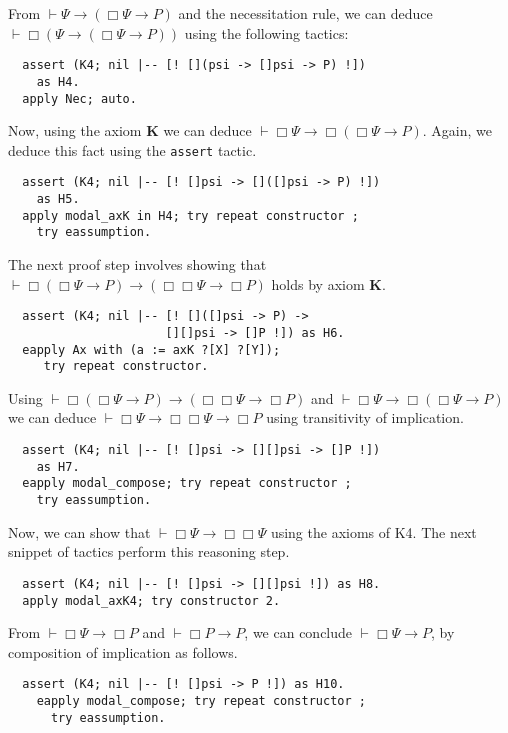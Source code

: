 \documentclass[sigconf,anonymous]{acmart}
\begin{document}
From $\vdash \Psi \to (\Box \Psi \to P)$ and the necessitation
rule, we can deduce $\vdash \Box (\Psi \to (\Box \Psi \to P))$
using the following tactics:
\begin{verbatim}
  assert (K4; nil |-- [! [](psi -> []psi -> P) !])
    as H4.
  apply Nec; auto.
\end{verbatim}

\noindent Now, using the axiom \textbf{K} we can deduce $\vdash \Box \Psi \to
\Box (\Box \Psi \to P)$. Again, we deduce this fact using the
\texttt{assert} tactic.

\begin{verbatim}
  assert (K4; nil |-- [! []psi -> []([]psi -> P) !])
    as H5.
  apply modal_axK in H4; try repeat constructor ;
    try eassumption.
\end{verbatim}

\noindent The next proof step involves showing that
$\vdash \Box (\Box \Psi \to P)\to (\Box \Box \Psi \to \Box P)$ holds
by axiom \textbf{K}.

\begin{verbatim}
  assert (K4; nil |-- [! []([]psi -> P) ->
                      [][]psi -> []P !]) as H6.
  eapply Ax with (a := axK ?[X] ?[Y]);
     try repeat constructor.
\end{verbatim}

\noindent Using $\vdash \Box (\Box \Psi \to P)\to (\Box \Box \Psi \to \Box P)$ and
$\vdash \Box \Psi \to\Box (\Box \Psi \to P)$ we can deduce
$\vdash \Box \Psi \to \Box \Box \Psi \to \Box P$ using transitivity of
implication.

\begin{verbatim}
  assert (K4; nil |-- [! []psi -> [][]psi -> []P !])
    as H7.
  eapply modal_compose; try repeat constructor ;
    try eassumption.
\end{verbatim}

\noindent Now, we can show that $\vdash\Box\Psi\to\Box\Box\Psi$ using
the axioms of K4. The next snippet of tactics perform this
reasoning step.

\begin{verbatim}
  assert (K4; nil |-- [! []psi -> [][]psi !]) as H8.
  apply modal_axK4; try constructor 2.
\end{verbatim}

\noindent From $\vdash \Box\Psi \to \Box P$ and $\vdash \Box P \to P$, we can
conclude $\vdash \Box \Psi \to P$, by composition of implication as
follows.

\begin{verbatim}
  assert (K4; nil |-- [! []psi -> P !]) as H10.
    eapply modal_compose; try repeat constructor ;
      try eassumption.
\end{verbatim}
\end{document}
